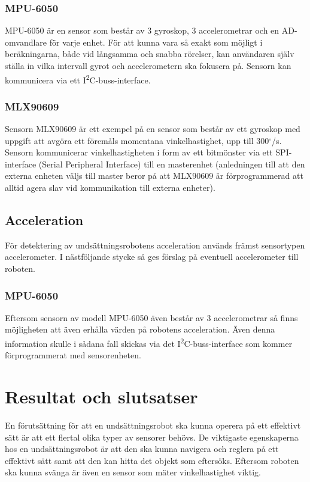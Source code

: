 \documentclass[11pt]{article}
\begin{document}
\begin{flushleft}
\subsubsection{MPU-6050}
MPU-6050 är en sensor som består av 3 gyroskop, 3 accelerometrar och en AD-omvandlare för varje enhet. För att kunna vara så exakt som möjligt i beräkningarna, både vid långsamma och snabba rörelser, kan användaren själv ställa in vilka intervall gyrot och accelerometern ska fokusera på. Sensorn kan kommunicera via ett I\textsuperscript{2}C-buss-interface. \cite{MPU}

\subsubsection{MLX90609}
Sensorn MLX90609 är ett exempel på en sensor som består av ett gyroskop med uppgift att avgöra ett föremåls momentana vinkelhastighet, upp till 300$^{\circ}$/s. Sensorn kommunicerar vinkelhastigheten i form av ett bitmönster via ett SPI-interface (Serial Peripheral Interface) till en masterenhet (anledningen till att den externa enheten väljs till master beror på att MLX90609 är förprogrammerad att alltid agera slav vid kommunikation till externa enheter). \cite{Melexis}

\subsection{Acceleration}
För detektering av undsättningsrobotens acceleration används främst sensortypen accelerometer. I nästföljande stycke så ges förslag på eventuell accelerometer till roboten.

\subsubsection{MPU-6050}
Eftersom sensorn av modell MPU-6050 även består av 3 accelerometrar så finns möjligheten att även erhålla värden på robotens acceleration. Även denna information skulle i sådana fall skickas via det I\textsuperscript{2}C-buss-interface som kommer förprogrammerat med sensorenheten. \cite{MPU}


\pagebreak
\section{Resultat och slutsatser}
En förutsättning för att en undsättningsrobot ska kunna operera på ett effektivt sätt är att ett flertal olika typer av sensorer behövs. De viktigaste egenskaperna hos en undsättningsrobot är att den ska kunna navigera och reglera på ett effektivt sätt samt att den kan hitta det objekt som eftersöks. Eftersom roboten ska kunna svänga är även en sensor som mäter vinkelhastighet viktig.


\end{flushleft}
\end{document}
